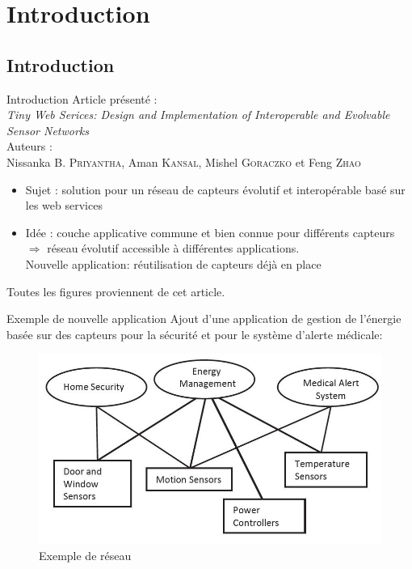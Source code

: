 
\section{Introduction}
\subsection{Introduction}
\begin{frame}{Introduction}
Article présenté :\\
\alert{\textit{Tiny Web Serices: Design and Implementation of Interoperable and Evolvable Sensor Networks}}\\
Auteurs :\\
Nissanka B. \textsc{Priyantha}, Aman \textsc{Kansal}, Mishel \textsc{Goraczko} et Feng \textsc{Zhao}
\begin{itemize}
\item Sujet : solution pour un réseau de capteurs évolutif et interopérable basé sur les web services
\item Idée : couche applicative commune et bien connue pour différents capteurs $\Rightarrow$ réseau évolutif accessible à différentes applications. \\Nouvelle application: réutilisation de capteurs déjà en place
\end{itemize}
Toutes les figures proviennent de cet article.
\end{frame}

\begin{frame}{Exemple de nouvelle application}
Ajout d'une application de gestion de l'énergie basée sur des capteurs pour la sécurité et pour le système d'alerte médicale: 
\begin{figure}
  \centering
  \includegraphics[scale=0.4]{figures/exemple.jpg}
  \caption{Exemple de réseau}
 \end{figure} 
\end{frame}


